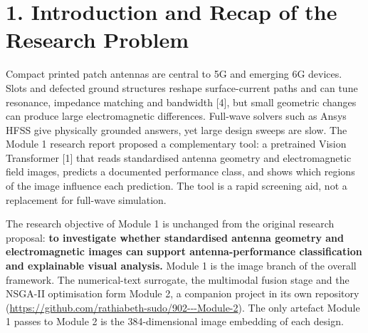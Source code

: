 \documentclass[11pt,a4paper]{article}
\begin{document}
\section*{1. Introduction and Recap of the Research Problem}
Compact printed patch antennas are central to 5G and emerging 6G devices. Slots and defected ground structures reshape surface-current paths and can tune resonance, impedance matching and bandwidth [4], but small geometric changes can produce large electromagnetic differences. Full-wave solvers such as Ansys HFSS give physically grounded answers, yet large design sweeps are slow. The Module 1 research report proposed a complementary tool: a pretrained Vision Transformer [1] that reads standardised antenna geometry and electromagnetic field images, predicts a documented performance class, and shows which regions of the image influence each prediction. The tool is a rapid screening aid, not a replacement for full-wave simulation.

The research objective of Module 1 is unchanged from the original research proposal: \textbf{to investigate whether standardised antenna geometry and electromagnetic images can support antenna-performance classification and explainable visual analysis.} Module 1 is the image branch of the overall framework. The numerical-text surrogate, the multimodal fusion stage and the NSGA-II optimisation form Module 2, a companion project in its own repository (\url{https://github.com/rathiabeth-sudo/902---Module-2}). The only artefact Module 1 passes to Module 2 is the 384-dimensional image embedding of each design.
\end{document}

